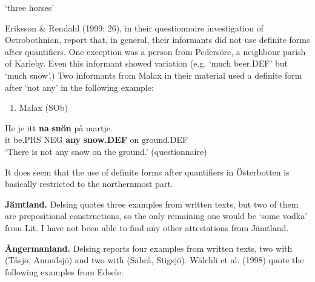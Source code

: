 ‘three horses’
\z


Eriksson \& Rendahl (1999: 26), in their questionnaire investigation of Ostrobothnian, report that, in general, their informants did not use definite forms after quantifiers. One exception was a person from Pedersöre, a neighbour parish of Karleby. Even this informant showed variation (e.g.  ‘much beer.DEF’ but  ‘much snow’.) Two informants from Malax in their material used a definite form after  ‘not any’ in the following example:

\begin{enumerate} %
\item 
Malax (SOb)

\end{enumerate} %
\ea\label{}
\gll He  je  itt  \textbf{na} \textbf{snön} på  martje.\\


it  be.PRS  NEG  \textbf{any} \textbf{snow.DEF} on  ground.DEF\\ %


‘There is not any snow on the ground.’ (questionnaire)
\z


It does seem that the use of definite forms after quantifiers in Österbotten is basically restricted to the northernmost part.

\textbf{Jämtland. }Delsing quotes three examples from written texts, but two of them are prepositional constructions, so the only remaining one would be  ‘some vodka’ from Lit. I have not been able to find any other attestations from Jämtland.

\textbf{Ångermanland.} Delsing reports four examples from written texts, two with  (Tåsjö, Anundsjö) and two with (Säbrå, Stigsjö). Wälchli et al. (1998) quote the following examples from Edsele:

